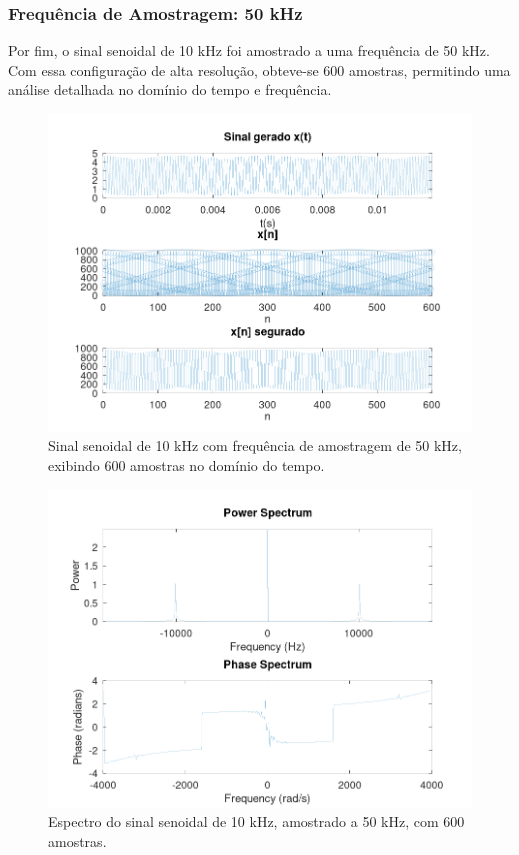 \subsubsection{Frequência de Amostragem: 50 kHz}

Por fim, o sinal senoidal de 10 kHz foi amostrado a uma frequência de 50 kHz. Com essa configuração de alta resolução, obteve-se 600 amostras, permitindo uma análise detalhada no domínio do tempo e frequência.

\begin{figure}[H]
    \centering
    \includegraphics[width=1\linewidth]{03_results/assets/sin__10KHz_fs50k_SIGNAL_600smp.png}
    \caption{Sinal senoidal de 10 kHz com frequência de amostragem de 50 kHz, exibindo 600 amostras no domínio do tempo.}
    \label{fig:signal-50kHz-10kHz-600smp}
\end{figure}

\begin{figure}[H]
    \centering
    \includegraphics[width=1\linewidth]{03_results/assets/sin__10KHz_fs50k_SPECTRUM_600smp.png}
    \caption{Espectro do sinal senoidal de 10 kHz, amostrado a 50 kHz, com 600 amostras.}
    \label{fig:spectrum-50kHz-10kHz-600smp}
\end{figure}

